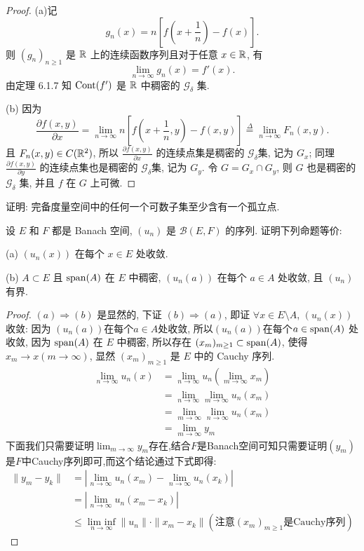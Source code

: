 \begin{proof}
    (a)记
    \[g_n(x)=n\left[f\left(x+\frac{1}{n}\right)-f(x)\right].\]
    则 $(g_n)_{n\geq 1}$ 是 $\mathbb{R}$ 上的连续函数序列且对于任意 $x\in\mathbb{R}$, 有
    \[\lim_{n\to\infty}g_n(x)=f'(x).\]
    由定理 6.1.7 知 $\mathrm{Cont}(f')$ 是 $\mathbb{R}$ 中稠密的 $\mathcal{G}_{\delta}$ 集.

    (b) 因为 
    \[\frac{\partial f(x,y)}{\partial x}=\lim\limits_{n\to\infty}n\left[f\left(x+\frac{1}{n},y\right)-f(x,y)\right]\overset{\Delta}{=}\lim\limits_{n\to\infty}F_n(x,y).\]
    且 $F_n(x,y)\in C(\mathbb{R}^2)$, 所以 $\frac{\partial f(x,y)}{\partial x}$ 
    的连续点集是稠密的 $\mathcal{G}_{\delta}$集, 记为 $G_x$;
    同理 $\frac{\partial f(x,y)}{\partial y}$ 的连续点集也是稠密的 $\mathcal{G}_{\delta}$集,
    记为 $G_y$. 令 $G=G_x\cap G_y$, 则 $G$ 也是稠密的 $\mathcal{G}_{\delta}$ 集, 并且 $f$ 在 $G$ 上可微.
\end{proof}



\begin{exercise}
    证明: 完备度量空间中的任何一个可数子集至少含有一个孤立点.
\end{exercise}




\begin{exercise}[5]
    设 $E$ 和 $F$ 都是 Banach 空间, $(u_n)$ 是 $\mathcal{B}(E,F)$ 的序列.
    证明下列命题等价:

    (a) $(u_n(x))$ 在每个 $x\in E$ 处收敛.

    (b) $A\subset E$ 且 $\operatorname{span}(A)$ 在 $E$ 中稠密, $(u_n(a))$ 在每个 $a\in A$ 处收敛,
    且 $(u_n)$ 有界.
\end{exercise}

\begin{proof}
    $(a)\Rightarrow(b)$ 是显然的, 下证 $(b)\Rightarrow(a)$,
    即证 $\forall x\in E\setminus A$, $(u_n(x))$ 收敛:
    因为 $(u_n(a))$在每个$a\in A$处收敛, 所以$(u_n(a))$在每个$a\in\operatorname{span}(A)$ 处收敛,
    因为 $\operatorname{span}(A)$ 在 $E$ 中稠密, 所以存在 $(x_m)_{m\geq1}\subset\operatorname{span}(A)$,
    使得 $x_m\to x(m\to\infty)$, 显然 $(x_m)_{m\geq1}$ 是 $E$ 中的 Cauchy 序列. 
    \[\begin{split}
    \lim_{n\to\infty}u_n(x)
    &=\lim_{n\to\infty}u_n\left(\lim_{m\to\infty}x_m\right)\\
    &=\lim_{n\to\infty}\lim_{m\to\infty}u_n(x_m)\\
    &=\lim_{m\to\infty}\lim_{n\to\infty}u_n(x_m)\\
    &=\lim_{m\to\infty}y_m\end{split}\]
    下面我们只需要证明$\lim_{m\to\infty}y_m$存在,结合$F$是Banach空间可知只需要证明$(y_m)$是$F$中Cauchy序列即可,而这个结论通过下式即得:
    \[\begin{split}
    \|y_m-y_k\|
    &=|\lim_{n\to\infty}u_n(x_m)-\lim_{n\to\infty}u_n(x_k)|\\
    &=|\lim_{n\to\infty}u_n(x_m-x_k)|\\
    &\leq\mathop{\textrm{lim inf}}\limits_{n\to\infty}\|u_n\|\cdot\|x_m-x_k\|\left(\mbox{注意}(x_m)_{m\geq1}\mbox{是}\mathrm{Cauchy}\mbox{序列}\right)
    \end{split}\]
\end{proof}



